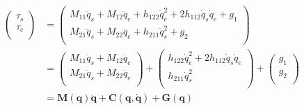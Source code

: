 \documentclass[pdftex,a4paper,11pt]{report}
\newcommand{\vs}[1]{\boldsymbol{#1}} %
\newcommand{\ms}[1]{\boldsymbol{#1}} %
\numberwithin{equation}{subsection}
\begin{document}
\begin{align*}
    \begin{pmatrix}
        \tau_s \\
        \tau_e \\
    \end{pmatrix}
    & = \begin{pmatrix}
        M_{11}\ddot{q}_s + M_{12}\ddot{q}_e + h_{122}\dot{q}_e^2 + 2h_{112}\dot{q}_s\dot{q}_e + g_1 \\
        M_{21}\ddot{q}_s + M_{22}\ddot{q}_e + h_{211}\dot{q}_s^2 + g_2 \\
    \end{pmatrix}\\
    & = \begin{pmatrix}
        M_{11}\ddot{q}_s + M_{12}\ddot{q}_e \\
        M_{21}\ddot{q}_s + M_{22}\ddot{q}_e \\
    \end{pmatrix} +
    \begin{pmatrix}
        h_{122}\dot{q}_e^2 + 2h_{112}\dot{q}_s\dot{q}_e \\
        h_{211}\dot{q}_s^2 \\
    \end{pmatrix} +
    \begin{pmatrix}
        g_1 \\
        g_2 \\
    \end{pmatrix}\\
    & = \ms{M}(\vs{q}) \vs{\ddot{q}} + \vs{C}(\vs{q}, \vs{\dot{q}}) + \vs{G}(\vs{q})
\end{align*}
\end{document}
